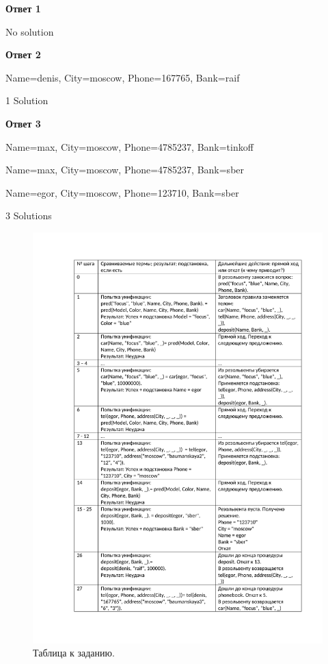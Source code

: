 \textbf{Ответ 1}

No solution

\textbf{Ответ 2}

Name=denis, City=moscow, Phone=167765, Bank=raif

1 Solution

\textbf{Ответ 3}

Name=max, City=moscow, Phone=4785237, Bank=tinkoff

Name=max, City=moscow, Phone=4785237, Bank=sber

Name=egor, City=moscow, Phone=123710, Bank=sber

3 Solutions

\newpage
\begin{figure}[H]
	\caption{Таблица к заданию.}
	\begin{center}
		\includegraphics[scale=0.85]{img/13.1.pdf}
	\end{center}
	
\end{figure}

